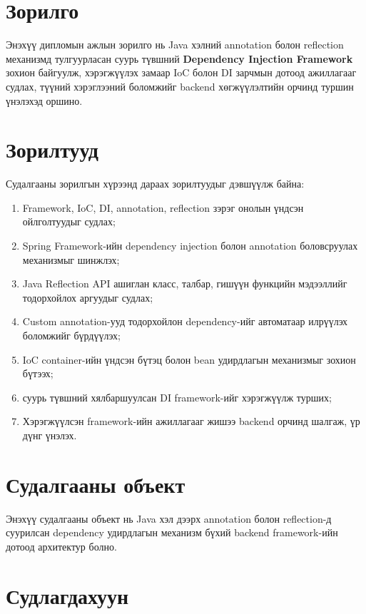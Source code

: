 \newpage
\section*{Зорилго}

Энэхүү дипломын ажлын зорилго нь Java хэлний annotation болон reflection механизмд тулгуурласан суурь түвшний \textbf{Dependency Injection Framework} зохион байгуулж, хэрэгжүүлэх замаар IoC болон DI зарчмын дотоод ажиллагааг судлах, түүний хэрэглээний боломжийг backend хөгжүүлэлтийн орчинд туршин үнэлэхэд оршино.

\section*{Зорилтууд}

Судалгааны зорилгын хүрээнд дараах зорилтуудыг дэвшүүлж байна:
\begin{enumerate}
    \item Framework, IoC, DI, annotation, reflection зэрэг онолын үндсэн ойлголтуудыг судлах;
    \item Spring Framework-ийн dependency injection болон annotation боловсруулах механизмыг шинжлэх;
    \item Java Reflection API ашиглан класс, талбар, гишүүн функцийн мэдээллийг тодорхойлох аргуудыг судлах;
    \item Custom annotation-ууд тодорхойлон dependency-ийг автоматаар илрүүлэх боломжийг бүрдүүлэх;
    \item IoC container-ийн үндсэн бүтэц болон bean удирдлагын механизмыг зохион бүтээх;
    \item суурь түвшний хялбаршуулсан DI framework-ийг хэрэгжүүлж турших;
    \item Хэрэгжүүлсэн framework-ийн ажиллагааг жишээ backend орчинд шалгаж, үр дүнг үнэлэх.
\end{enumerate}

\section*{Судалгааны объект}

Энэхүү судалгааны объект нь Java хэл дээрх annotation болон reflection-д суурилсан dependency удирдлагын механизм бүхий backend framework-ийн дотоод архитектур болно.

\section*{Судлагдахуун}

